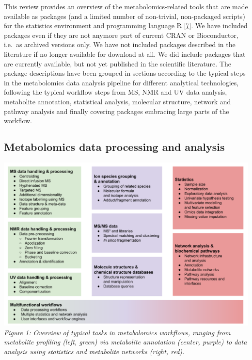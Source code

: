 \documentclass[]{article}
\begin{document}
This review provides an overview of the metabolomics-related tools that are made available as packages (and a limited number of non-trivial, non-packaged scripts) for the statistics environment and programming language R {[}\protect\hyperlink{ref-rcoredevelopmentteam_website_2018}{7}{]}. We have included packages even if they are not anymore part of current CRAN or Bioconductor, i.e.~as archived versions only. We have not included packages described in the literature if no longer available for download at all. We did include packages that are currently available, but not yet published in the scientific literature. The package descriptions have been grouped in sections according to the typical steps in the metabolomics data analysis pipeline for different analytical technologies, following the typical workflow steps from MS, NMR and UV data analysis, metabolite annotation, statistical analysis, molecular structure, network and pathway analysis and finally covering packages embracing large parts of the workflow.

\newpage

\hypertarget{metabolomics-data-processing-and-analysis}{%
\subsection{Metabolomics data processing and analysis}\label{metabolomics-data-processing-and-analysis}}

\includegraphics{figures/Figure 1.png}
\emph{Figure 1: Overview of typical tasks in metabolomics workflows, ranging from metabolite profiling (left, green) via metabolite annotation (center, purple) to data analysis using statistics and metabolite networks (right, red).}
\end{document}
